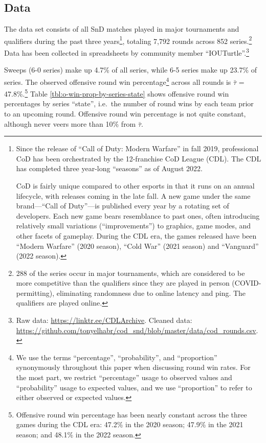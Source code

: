 \documentclass{article}
\begin{document}
\hypertarget{data}{%
\subsection{Data}\label{data}}

The data set consists of all SnD matches played in major tournaments and
qualifiers during the past three years\footnote{Since the release of
  ``Call of Duty: Modern Warfare'' in fall 2019, professional CoD has
  been orchestrated by the 12-franchise CoD League (CDL). The CDL has
  completed three year-long ``seasons'' as of August 2022.

  CoD is fairly unique compared to other esports in that it runs on an
  annual lifecycle, with releases coming in the late fall. A new game
  under the same brand---``Call of Duty''---is published every year by a
  rotating set of developers. Each new game bears resemblance to past
  ones, often introducing relatively small variations (``improvements'')
  to graphics, game modes, and other facets of gameplay. During the CDL
  era, the games released have been ``Modern Warfare'' (2020 season),
  ``Cold War'' (2021 season) and ``Vanguard'' (2022 season).}, totaling
7,792 rounds across 852 series.\footnote{288 of the series occur in
  major tournaments, which are considered to be more competitive than
  the qualifiers since they are played in person (COVID-permitting),
  eliminating randomness due to online latency and ping. The qualifiers
  are played online.} Data has been collected in spreadsheets by
community member ``IOUTurtle''.\footnote{Raw data:
  \url{https://linktr.ee/CDLArchive}. Cleaned data:
  \url{https://github.com/tonyelhabr/cod_snd/blob/master/data/cod_rounds.csv}.}

Sweeps (6-0 series) make up 4.7\% of all series, while 6-5 series make
up 23.7\% of series. The observed offensive round win
percentage\footnote{We use the terms ``percentage'', ``probability'',
  and ``proportion'' synonymously throughout this paper when discussing
  round win rates. For the most part, we restrict ``percentage'' usage
  to observed values and ``probability'' usage to expected values, and
  we use ``proportion'' to refer to either observed or expected values.}
across all rounds is \(\bar{\tau}\) = 47.8\%.\footnote{Offensive round
  win percentage has been nearly constant across the three games during
  the CDL era: 47.2\% in the 2020 season; 47.9\% in the 2021 season; and
  48.1\% in the 2022 season.} Table \ref{tbl:o-win-prop-by-series-state}
shows offensive round win percentages by series ``state'', i.e.~the
number of round wins by each team prior to an upcoming round. Offensive
round win percentage is not quite constant, although never veers more
than 10\% from \(\bar{\tau}\).
\end{document}
